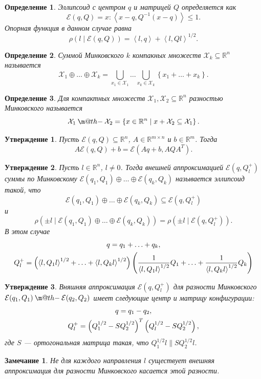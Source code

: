 \documentclass[12pt]{article}
\makeatletter
\theoremstyle{rusdef}
\newtheorem{remark}{Замечание}
\newtheorem{definition}{Определение}
\newtheorem{proposition}{Утверждение}
\newcommand{\scalar}[2]{\left<#1,#2\right>}
\newcommand{\R}{\ensuremath{\mathbb{R}}} %
\newcommand{\E}{\ensuremath{\mathcal{E}}} %
\newcommand{\dotminus}{\mathbin{\text{\@dotminus}}}
\newcommand{\@dotminus}{%
	\ooalign{\hidewidth\raise1ex\hbox{.}\hidewidth\cr$\m@th-$\cr}%
}
\makeatother
\begin{document}
\begin{definition}
Эллипсоид с центром $q$ и матрицей $Q$ определяется как
$$
\E(q, Q) = {x: \scalar{x-q}{Q^{-1}(x-q)} \leqslant 1}.
$$
Опорная функция в данном случае равна
$$
\rho(l \mid \E(q,Q)) = \scalar{l}{q} + \scalar{l}{Ql}^{1/2}.
$$
\end{definition}

\begin{definition}
Суммой Минковского $k$ компакных множеств $\mathcal{X}_k \subseteq \R^n$ называется
$$
\mathcal{X}_1 \oplus \ldots \oplus \mathcal{X}_k = \bigcup\limits_{x_1 \in \mathcal{X}_1} \ldots \bigcup\limits_{x_k \in \mathcal{X}_k} \left\{ x_1 + \ldots + x_k \right\}.
$$
\end{definition}

\begin{definition}
Для компактных множеств $\mathcal{X}_1, \mathcal{X}_2 \subseteq \R^n$ разностью Минковского называется
$$
\mathcal{X}_1 \dotminus \mathcal{X}_2 = \left\{ x \in \R^n \mid x + \mathcal{X}_2 \subseteq \mathcal{X}_1 \right\}.
$$
\end{definition}

\begin{proposition}
Пусть $\E(q, Q) \subseteq \R^n$, $A \in \R^{m \times n}$ и $b \in \R^m$. Тогда
$$
A\E(q, Q) + b = \E(Aq + b, AQA^T).
$$
\end{proposition}

\begin{proposition}
Пусть $l \in \R^n$, $l \neq 0$. Тогда внешней аппроксимацией $\E(q, Q_l^+)$ суммы по Минковскому $\E(q_1, Q_1) \oplus \ldots \oplus \E(q_k, Q_k)$ называется эллипсоид такой, что
$$
\E(q_1, Q_1) \oplus \ldots \oplus \E(q_k, Q_k) \subseteq \E(q, Q_l^+)
$$
и
$$
\rho(\pm l \mid \E(q_1, Q_1) \oplus \ldots \oplus \E(q_k, Q_k)) = \rho(\pm l \mid \E(q, Q_l^+)).
$$
В этом случае
\begin{gather}
q = q_1 + \ldots + q_k, \notag \\
Q_l^+ = \left( \scalar{l}{Q_1 l}^{1/2} + \ldots + \scalar{l}{Q_k l}^{1/2} \right) \left( \frac{1}{\scalar{l}{Q_1 l}^{1/2}}Q_1 + \ldots + \frac{1}{\scalar{l}{Q_k l}^{1/2}}Q_k \right) \notag
\end{gather}
\end{proposition}

\begin{proposition}
Вняшняя аппроксимация $\E(q, Q_l^+)$ для разности Минковского $\E(q_1, Q_1) \dotminus \E(q_2, Q_2)$ имеет следующие центр и матрицу конфигурации:
\begin{gather}
q = q_1 - q_2, \notag \\
Q_l^+ = \left( Q_1^{1/2} - SQ_2^{1/2} \right)^T \left( Q_l^{1/2} - SQ_2^{1/2} \right), \notag
\end{gather}
где $S$ --- ортогональная матрица такая, что $Q_1^{1/2}l \parallel SQ_2^{1/2}l$.
\end{proposition}
\begin{remark}
Не для каждого направления $l$ существует внешняя аппроксимация для разности Минковского касается этой разности.
\end{remark}
\end{document}
